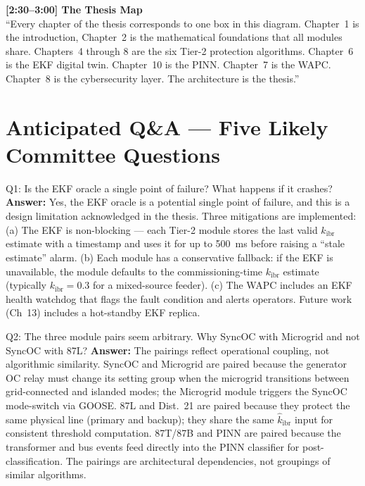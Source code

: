 \documentclass[12pt,a4paper]{article}
\newcommand{\kibr}{k_\mathrm{ibr}}
\newcommand{\kibrhat}{\hat{k}_\mathrm{ibr}}
\begin{document}
\begin{speakbox}
\medskip
\textbf{[2:30--3:00] The Thesis Map}\\
``Every chapter of the thesis corresponds to one box in this diagram.  Chapter~1 is the introduction, Chapter~2 is
the mathematical foundations that all modules share.  Chapters~4 through 8 are the
six Tier-2 protection algorithms.  Chapter~6 is the EKF digital twin.  Chapter~10
is the PINN.  Chapter~7 is the WAPC.  Chapter~8 is the cybersecurity layer.  The
architecture is the thesis.''
\end{speakbox}

\section{Anticipated Q\&A --- Five Likely Committee Questions}

\begin{keybox}{Q1: Is the EKF oracle a single point of failure? What happens if it crashes?}
\textbf{Answer:}  Yes, the EKF oracle is a potential single point of failure, and this
is a design limitation acknowledged in the thesis.  Three mitigations are implemented:
(a) The EKF is non-blocking --- each Tier-2 module stores the last valid $\kibrhat$
estimate with a timestamp and uses it for up to 500~ms before raising a ``stale
estimate'' alarm.  (b) Each module has a conservative fallback: if the EKF is
unavailable, the module defaults to the commissioning-time $\kibr$ estimate
(typically $\kibr = 0.3$ for a mixed-source feeder).  (c) The WAPC includes an
EKF health watchdog that flags the fault condition and alerts operators.
Future work (Ch~13) includes a hot-standby EKF replica.
\end{keybox}

\begin{keybox}{Q2: The three module pairs seem arbitrary. Why SyncOC with Microgrid and not SyncOC with 87L?}
\textbf{Answer:}  The pairings reflect operational coupling, not algorithmic similarity.
SyncOC and Microgrid are paired because the generator OC relay must change its setting
group when the microgrid transitions between grid-connected and islanded modes; the
Microgrid module triggers the SyncOC mode-switch via GOOSE.  87L and Dist.~21 are
paired because they protect the same physical line (primary and backup); they share
the same $\kibrhat$ input for consistent threshold computation.  87T/87B and PINN are
paired because the transformer and bus events feed directly into the PINN classifier
for post-classification.  The pairings are architectural dependencies, not groupings
of similar algorithms.
\end{keybox}
\end{document}
